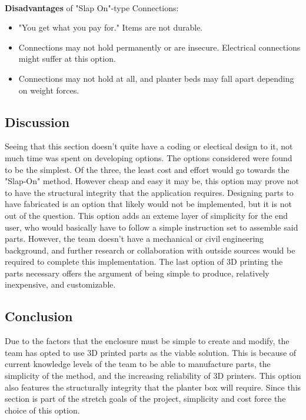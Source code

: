 \documentclass[onecolumn, draftclsnofoot,10pt, compsoc]{IEEEtran}
\begin{document}
		\noindent \\ \textbf{Disadvantages} of "Slap On"-type Connections:
		\begin{itemize}
			\item "You get what you pay for." Items are not durable.
			\item Connections may not hold permanently or are insecure.  Electrical connections might suffer at this option.
			\item Connections may not hold at all, and planter beds may fall apart depending on weight forces.
		\end{itemize}


		\subsection{Discussion}
		Seeing that this section doesn't quite have a coding or electical design to it, not much time was spent on developing options.  The options considered were found to be the
		simplest.  Of the three, the least cost and effort would go towards the "Slap-On" method.  However cheap and easy it may be, this option may prove not to have the structural
		integrity that the application requires.  Designing parts to have fabricated is an option that likely would not be implemented, but it is not out of the question.  This option
		adds an exteme layer of simplicity for the end user, who would basically have to follow a simple instruction set to assemble said parts.  However, the team doesn't have a
		mechanical or civil engineering background, and further research or collaboration with outside sources would be required to complete this implementation.  The last option of
		3D printing the parts necessary offers the argument of being simple to produce, relatively inexpensive, and customizable.

		\subsection{Conclusion}
		Due to the factors that the enclosure must be simple to create and modify, the team has opted to use 3D printed parts as the viable solution.  This is because of current knowledge
		levels of the team to be able to manufacture parts, the simplicity of the method, and the increasing reliability of 3D printers.  This option also features the structurally integrity
		that the planter box will require.  Since this section is part of the stretch goals of the project, simplicity and cost force the choice of this option.
\end{document}
